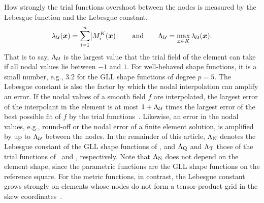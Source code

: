 How strongly the trial functions overshoot between the nodes is measured by the Lebesgue function and the Lebesgue constant,
%
\begin{equation}
  \lambda_{\mathcal U}(\bm{x})=\sum\limits^{n}_{i=1}\bigl|M_i^K(\bm{x})\bigr|\qquad\text{and}\qquad
  \Lambda_{\mathcal U}=\max_{\bm{x}\in K}\lambda_{\mathcal U}(\bm{x}) .
  \label{eq:lebesgue}
\end{equation}
%
That is to say, $\Lambda_{\mathcal U}$ is the largest value that the trial field of the element can take if all nodal values lie between $-1$ and $1$. For well-behaved shape functions, it is a small number, e.g., $3.2$ for the GLL shape functions of degree $p=5$. The Lebesgue constant is also the factor by which the nodal interpolation can amplify an error. If the nodal values of a smooth field $f$ are interpolated, the largest error of the interpolant in the element is at most $1+\Lambda_{\mathcal U}$ times the largest error of the best possible fit of $f$ by the trial functions~\cite{Brutman1997Lebesgue}. Likewise, an error in the nodal values, e.g., round-off or the nodal error of a finite element solution, is amplified by up to $\Lambda_{\mathcal U}$ between the nodes. In the remainder of this article, $\Lambda_{\mathrm{N}}$ denotes the Lebesgue constant of the GLL shape functions of \PP, and $\Lambda_{\mathrm{Q}}$ and $\Lambda_{\mathrm{T}}$ those of the trial functions of \PM\ and \PH, respectively. Note that $\Lambda_{\mathrm{N}}$ does not depend on the element shape, since the parametric functions are the GLL shape functions on the reference square. For the metric functions, in contrast, the Lebesgue constant grows strongly on elements whose nodes do not form a tensor-product grid in the skew coordinates~\cite{Eisentraeger2026axisymmetric}.
